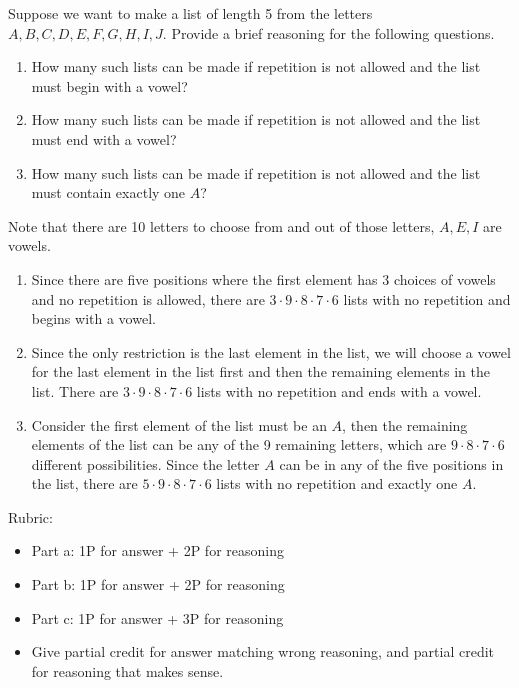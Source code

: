 \documentclass{article}
\theoremstyle{definition}
\begin{document}
\begin{question}
    Suppose we want to make a list of length 5 from the letters $A, B, C, D, E, F, G, H, I, J$. Provide a brief reasoning for the following questions.
        \begin{enumerate}
            \item How many such lists can be made if repetition is not allowed and the list must begin with a vowel?
            \item How many such lists can be made if repetition is not allowed and the list must end with a vowel?
            \item How many such lists can be made if repetition is not allowed and the list must contain exactly one $A$?
        \end{enumerate}
\end{question}
\begin{solution}
Note that there are 10 letters to choose from and out of those letters, $A, E, I$ are vowels.
    \begin{enumerate}
        \item Since there are five positions where the first element has 3 choices of vowels and no repetition is allowed, there are $3\cdot 9 \cdot 8\cdot 7\cdot 6$ lists with no repetition and begins with a vowel. 
        \item Since the only restriction is the last element in the list, we will choose a vowel for the last element in the list first and then the remaining elements in the list. There are $3\cdot 9 \cdot 8\cdot 7\cdot 6$ lists with no repetition and ends with a vowel. 
        \item Consider the first element of the list must be an $A$, then the remaining elements of the list can be any of the 9 remaining letters, which are $9 \cdot 8\cdot 7\cdot 6$ different possibilities. Since the letter $A$ can be in any of the five positions in the list, there are $5\cdot 9 \cdot 8\cdot 7\cdot 6$ lists with no repetition and exactly one $A$.
    \end{enumerate}

{\color{red} Rubric:
\begin{itemize}
\item Part a: 1P for answer + 2P for reasoning
\item Part b: 1P for answer + 2P for reasoning
\item Part c: 1P for answer + 3P for reasoning
\item Give partial credit for answer matching wrong reasoning, and partial credit for reasoning that makes sense.
\end{itemize}}
\end{solution}
\end{document}

